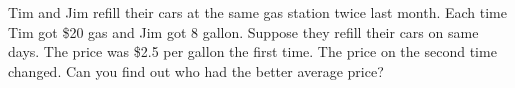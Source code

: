 \begin{exercise}
  Tim and Jim refill their cars at the same gas station twice last month.
  Each time Tim got \$20 gas and Jim got 8 gallon. Suppose they refill
  their cars on same days. The price was \$2.5 per gallon the first time.
  The price on the second time changed. Can you find out who had the
  better average price?
\end{exercise}
\vspace*{4\baselineskip}

